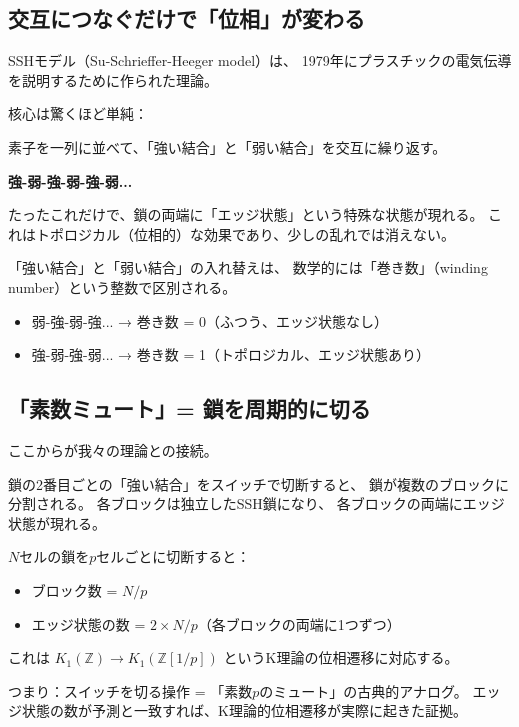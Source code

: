 \documentclass[12pt,a4paper]{article}
\begin{document}
\subsection{交互につなぐだけで「位相」が変わる}

SSHモデル（Su-Schrieffer-Heeger model）は、
1979年にプラスチックの電気伝導を説明するために作られた理論。

核心は驚くほど単純：

\begin{keybox}[SSHモデルの原理]
素子を一列に並べて、「強い結合」と「弱い結合」を交互に繰り返す。

\textbf{強-弱-強-弱-強-弱...}

たったこれだけで、鎖の両端に「エッジ状態」という特殊な状態が現れる。
これはトポロジカル（位相的）な効果であり、少しの乱れでは消えない。
\end{keybox}

「強い結合」と「弱い結合」の入れ替えは、
数学的には「巻き数」（winding number）という整数で区別される。

\begin{itemize}
\item 弱-強-弱-強... → 巻き数 = 0（ふつう、エッジ状態なし）
\item 強-弱-強-弱... → 巻き数 = 1（トポロジカル、エッジ状態あり）
\end{itemize}

\subsection{「素数ミュート」= 鎖を周期的に切る}

ここからが我々の理論との接続。

鎖の2番目ごとの「強い結合」をスイッチで切断すると、
鎖が複数のブロックに分割される。
各ブロックは独立したSSH鎖になり、
各ブロックの両端にエッジ状態が現れる。

\begin{keybox}
$N$セルの鎖を$p$セルごとに切断すると：
\begin{itemize}
\item ブロック数 = $N/p$
\item エッジ状態の数 = $2 \times N/p$（各ブロックの両端に1つずつ）
\end{itemize}

これは $K_1(\mathbb{Z}) \to K_1(\mathbb{Z}[1/p])$
というK理論の位相遷移に対応する。
\end{keybox}

つまり：スイッチを切る操作 = 「素数$p$のミュート」の古典的アナログ。
エッジ状態の数が予測と一致すれば、K理論的位相遷移が実際に起きた証拠。
\end{document}
